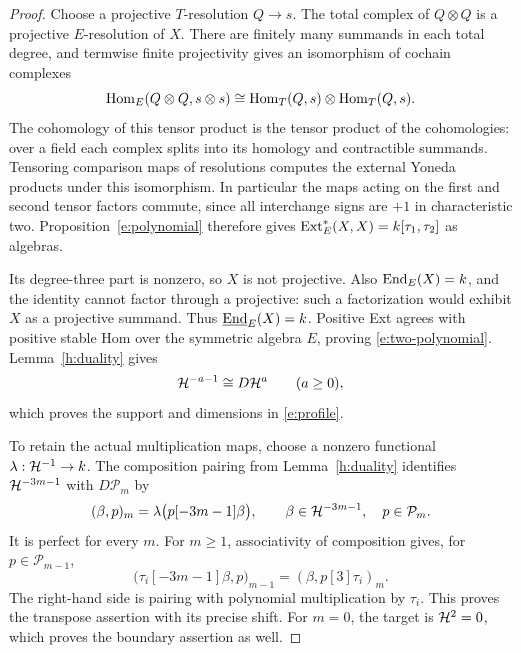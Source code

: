 \begin{proof}
Choose a projective \(T\)-resolution \(Q\to s\).  The total complex
of \(Q\otimes Q\) is a projective \(E\)-resolution of \(X\).  There
are finitely many summands in each total degree, and termwise finite
projectivity gives an isomorphism of cochain complexes
\[
\operatorname{Hom}_E(Q\otimes Q,s\otimes s)
 \cong\operatorname{Hom}_T(Q,s)\otimes\operatorname{Hom}_T(Q,s).
\]
The cohomology of this tensor product is the tensor product of the
cohomologies: over a field each complex splits into its homology and
contractible summands.  Tensoring comparison maps of resolutions
computes the external Yoneda products under this isomorphism.
In particular the maps acting on the first and second tensor factors
commute, since all interchange signs are \(+1\) in characteristic
two.  Proposition~\ref{e:polynomial} therefore gives
\(\operatorname{Ext}_E^*(X,X)=k[\tau_1,\tau_2]\) as algebras.

Its degree-three part is nonzero, so \(X\) is not projective.  Also
\(\operatorname{End}_E(X)=k\), and the identity cannot factor through a projective:
such a factorization would exhibit \(X\) as a projective summand.
Thus \(\underline{\operatorname{End}}_E(X)=k\).  Positive Ext agrees with positive stable Hom
over the symmetric algebra \(E\), proving \eqref{e:two-polynomial}.
Lemma~\ref{h:duality} gives
\[
\mathcal H^{-a-1}\cong D\mathcal H^a\qquad(a\ge0),
\]
which proves the support and dimensions in \eqref{e:profile}.

To retain the actual multiplication maps, choose a nonzero functional
\(\lambda:\mathcal H^{-1}\to k\).  The composition pairing from
Lemma~\ref{h:duality} identifies \(\mathcal H^{-3m-1}\) with
\(D\mathcal P_m\) by
\begin{equation}
(\beta,p)_m
 =\lambda\bigl(p[-3m-1]\beta\bigr),
\qquad
\beta\in\mathcal H^{-3m-1},\quad p\in\mathcal P_m.
\label{e:pairing}
\end{equation}
It is perfect for every \(m\).  For \(m\ge1\), associativity of
composition gives, for \(p\in\mathcal P_{m-1}\),
\begin{equation}
\bigl(\tau_i[-3m-1]\beta,p\bigr)_{m-1}
 =(\beta,p[3]\tau_i)_m.
\label{e:transpose}
\end{equation}
The right-hand side is pairing with polynomial multiplication by
\(\tau_i\).  This proves the transpose assertion with its precise
shift.  For \(m=0\), the target is \(\mathcal H^2=0\), which proves the
boundary assertion as well.
\end{proof}

